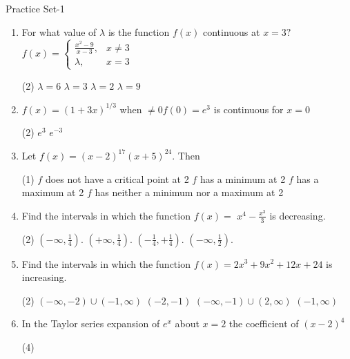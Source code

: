 \begin{abox}
	Practice Set-1
\end{abox}
\begin{enumerate}
	\item For what value of $\lambda$ is the function $f(x)$ continuous at $x=3 ?$
	$
	f(x)=\left\{\begin{aligned}
	\frac{x^{2}-9}{x-3}, & x \neq 3 \\
	\lambda, & x=3
	\end{aligned}\right.
	$
	\begin{tasks}(2)
		\task[\textbf{a.}]$\lambda=6$  
		\task[\textbf{b.}]$\lambda=3$  
		\task[\textbf{c.}]$\lambda=2$   
		\task[\textbf{d.}]$\lambda=9$   
	\end{tasks}
	\item $f(x)=(1+3 x)^{1 / 3}$ when $\neq 0 f(0)=e^{3}$ is continuous for $x=0$
	\begin{tasks}(2)
		\task[\textbf{c.}]$e^{3}$ 
		\task[\textbf{d.}]$e^{-3}$
	\end{tasks}
	\item Let $f(x)=(x-2)^{17}(x+5)^{24}$. Then
	\begin{tasks}(1)
		\task[\textbf{a.}] $f$ does not have a critical point at 2  
		\task[\textbf{b.}]$f$ has a minimum at 2
		\task[\textbf{c.}] $f$ has a maximum at 2
		\task[\textbf{d.}] $f$ has neither a minimum nor a maximum at 2
	\end{tasks}
	\item Find the intervals in which the function $f(x)=$ $x^{4}-\frac{x^{3}}{3}$ is decreasing.
	\begin{tasks}(2)
		\task[\textbf{a.}]$\left(-\infty, \frac{1}{4}\right)$.  
		\task[\textbf{b.}]$\left(+\infty, \frac{1}{4}\right)$. 
		\task[\textbf{c.}]$\left(-\frac{1}{4}, +\frac{1}{4}\right)$.  
		\task[\textbf{d.}]$\left(-\infty, \frac{1}{2}\right)$.   
	\end{tasks}
	\item Find the intervals in which the function $f(x)=2 x^{3}+9 x^{2}+12 x+24$ is increasing.
	\begin{tasks}(2)
		\task[\textbf{a.}] $(-\infty,-2) \cup(-1, \infty)$ 
		\task[\textbf{b.}]$(-2,-1)$
		\task[\textbf{c.}]$(-\infty,-1) \cup(2, \infty)$ 
		\task[\textbf{d.}]$(-1, \infty)$ 
	\end{tasks}
	\item In the Taylor series expansion of $e^{x}$ about $x=2$ the coefficient of $(x-2)^{4}$
	\begin{tasks}(4)

\end{tasks}
\end{enumerate}
